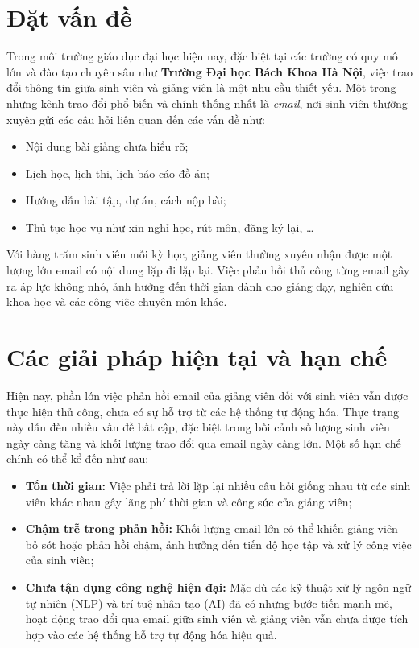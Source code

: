 \documentclass[../DoAn.tex]{subfiles}
\begin{document}
\section{Đặt vấn đề}
\label{sec:dvd}

Trong môi trường giáo dục đại học hiện nay, đặc biệt tại các trường có quy mô lớn và đào tạo chuyên sâu như \textbf{Trường Đại học Bách Khoa Hà Nội}, việc trao đổi thông tin giữa sinh viên và giảng viên là một nhu cầu thiết yếu. Một trong những kênh trao đổi phổ biến và chính thống nhất là \textit{email}, nơi sinh viên thường xuyên gửi các câu hỏi liên quan đến các vấn đề như:

\begin{itemize}
    \item Nội dung bài giảng chưa hiểu rõ;
    \item Lịch học, lịch thi, lịch báo cáo đồ án;
    \item Hướng dẫn bài tập, dự án, cách nộp bài;
    \item Thủ tục học vụ như xin nghỉ học, rút môn, đăng ký lại, \ldots
\end{itemize}

Với hàng trăm sinh viên mỗi kỳ học, giảng viên thường xuyên nhận được một lượng lớn email có nội dung lặp đi lặp lại. Việc phản hồi thủ công từng email gây ra áp lực không nhỏ, ảnh hưởng đến thời gian dành cho giảng dạy, nghiên cứu khoa học và các công việc chuyên môn khác.


\section{Các giải pháp hiện tại và hạn chế}
\label{sec:giaiphap}

Hiện nay, phần lớn việc phản hồi email của giảng viên đối với sinh viên vẫn được thực hiện thủ công, chưa có sự hỗ trợ từ các hệ thống tự động hóa. Thực trạng này dẫn đến nhiều vấn đề bất cập, đặc biệt trong bối cảnh số lượng sinh viên ngày càng tăng và khối lượng trao đổi qua email ngày càng lớn. Một số hạn chế chính có thể kể đến như sau:

\begin{itemize}
    \item \textbf{Tốn thời gian:} Việc phải trả lời lặp lại nhiều câu hỏi giống nhau từ các sinh viên khác nhau gây lãng phí thời gian và công sức của giảng viên;
    
    \item \textbf{Chậm trễ trong phản hồi:} Khối lượng email lớn có thể khiến giảng viên bỏ sót hoặc phản hồi chậm, ảnh hưởng đến tiến độ học tập và xử lý công việc của sinh viên;
    
    \item \textbf{Chưa tận dụng công nghệ hiện đại:} Mặc dù các kỹ thuật xử lý ngôn ngữ tự nhiên (NLP) và trí tuệ nhân tạo (AI) đã có những bước tiến mạnh mẽ, hoạt động trao đổi qua email giữa sinh viên và giảng viên vẫn chưa được tích hợp vào các hệ thống hỗ trợ tự động hóa hiệu quả.
\end{itemize}
\end{document}
